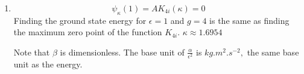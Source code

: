 \begin{enumerate}

    \begin{align*}
        \int_{0}^\infty
        A^2xK_{4i}^2(x)dx
        \approx
        4.38232\times10^{-5}\cdot A^2
        \Rightarrow A\approx 151.
    \end{align*}

        \item 
        $$
        \psi_\kappa(1)
        =AK_{4i}(\kappa)=0
        $$
        Finding the ground state energy for $\epsilon=1$ and $g=4$
         is the same as finding the maximum zero point of the function $K_{4i}.$ $\kappa\approx 1.6954$


         Note that $\beta$ is dimensionless. 
         The base unit of 
         $\frac{\alpha}{\epsilon^2}$ is $\unit{kg.m^2.s^{-2}},$ the same base unit as the energy.

        
\end{enumerate}

